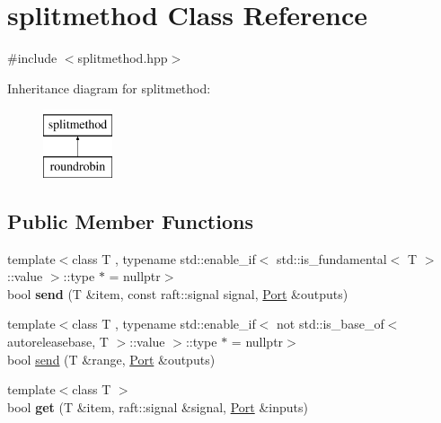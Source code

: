 \hypertarget{classsplitmethod}{}\section{splitmethod Class Reference}
\label{classsplitmethod}


{\ttfamily \#include $<$splitmethod.\+hpp$>$}

Inheritance diagram for splitmethod\+:\begin{figure}[H]
\begin{center}
\leavevmode
\includegraphics[height=2.000000cm]{classsplitmethod}
\end{center}
\end{figure}
\subsection*{Public Member Functions}
\begin{DoxyCompactItemize}
\item 
\hypertarget{classsplitmethod_a8ccafddc675963367cbff3939373e7b8}{}{\footnotesize template$<$class T , typename std\+::enable\+\_\+if$<$                                                                                                          std\+::is\+\_\+fundamental$<$ T $>$\+::value $>$\+::type $\ast$  = nullptr$>$ }\\bool {\bfseries send} (T \&item, const raft\+::signal signal, \hyperlink{class_port}{Port} \&outputs)\label{classsplitmethod_a8ccafddc675963367cbff3939373e7b8}

\item 
{\footnotesize template$<$class T , typename std\+::enable\+\_\+if$<$                                                                                                      not std\+::is\+\_\+base\+\_\+of$<$ autoreleasebase,                                                                                                                                                           T $>$\+::value $>$\+::type $\ast$  = nullptr$>$ }\\bool \hyperlink{classsplitmethod_af9067e627d58d344cd1b11bc9d3e92d6}{send} (T \&range, \hyperlink{class_port}{Port} \&outputs)
\item 
\hypertarget{classsplitmethod_a72e3c5295001d5370c19d56b7ed1d07a}{}{\footnotesize template$<$class T $>$ }\\bool {\bfseries get} (T \&item, raft\+::signal \&signal, \hyperlink{class_port}{Port} \&inputs)\label{classsplitmethod_a72e3c5295001d5370c19d56b7ed1d07a}

\end{DoxyCompactItemize}
